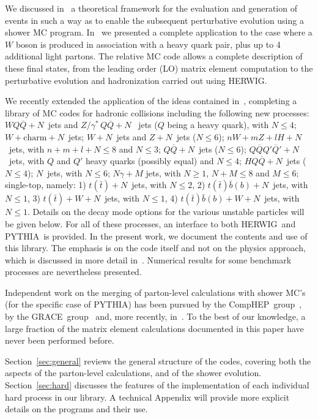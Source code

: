 \documentclass[paper]{JHEP3}
\def    \Qbar   {\overline{Q}}
\def\herwig{{\small HERWIG}}
\def\pythia{{\small PYTHIA}}
\def\grace{{\small GRACE}}
\def\comphep{{\small CompHEP}}
\begin{document}
 We discussed in~\cite{Caravaglios:1999yr} a theoretical framework for
the evaluation and generation of events in such a way as to enable the
subsequent perturbative evolution using a shower MC program.
In~\cite{Mangano:2001xp} we presented a complete application to the
case where a $W$ boson is produced in association with a heavy quark
pair, plus up to 4 additional light partons. The relative MC code
allows a complete description of these final states, from the leading
order (LO) matrix element computation to the perturbative evolution
and hadronization carried out using \herwig.

We recently extended the application of the ideas contained
in~\cite{Caravaglios:1999yr}, completing a library of MC codes for
hadronic collisions including the following new processes: $WQ\Qbar+
N$~jets and $Z/\gamma^{*} \, Q\Qbar+N$ ~jets ($Q$ being a heavy
quark), with $N\le 4$; $W+\mbox{charm}+ N$~jets; 
$W+ N$~jets and $Z+ N$~jets ($N\le 6$);
$nW+mZ+lH+N$~jets, with $n+m+l+N\le 8$ and $N\le3$; $Q\Qbar+N$~jets
($N\le 6$); $Q\Qbar Q'\Qbar'+N$~jets, with $Q$ and $Q'$ heavy quarks
(possibly equal) and $N\le 4$; $H Q \Qbar+N$~jets ($N\le 4$);
$N$~jets, with $N\le 6$; $N\gamma+M$ jets, with $N\ge 1$, $N+M\le 8$ 
and $M\le 6$; single-top, namely: 1) $t(\bar t)+N$~jets, with $N\le 2$, 
2) $t(\bar t) {\bar b}(b)+N$~jets, with $N\le 1$, 3) 
$t(\bar t)+W+N$~jets, with $N\le 1$,  4) $t(\bar t) {\bar b}(b)+W+N$~jets, 
with $N\le 1$. 
Details on the decay mode options for the
various unstable particles will be  given below. For all of these
processes, an interface to both \herwig\ and \pythia\ is provided. In the
present work, we document the contents and use of this library. The
emphasis is on the code itself and not on the physics approach, which
is  discussed in more detail in~\cite{Mangano:2001xp}. Numerical results for
some benchmark processes are nevertheless presented.

Independent work on the merging of parton-level calculations with
shower MC's (for the specific case of \pythia) has been pursued by the
\comphep\ group~\cite{Belyaev:2000wn}, by the \grace\ 
group~\cite{Sato:2001ae} and, more recently, 
in~\cite{Kersevan:2002dd,Tsuno:2002ae,Maltoni:2002qb}. 
To the best of our knowledge, a large fraction of the matrix element
calculations documented in this paper have never been performed before.

Section~\ref{sec:general} reviews the general structure of the codes,
covering both the aspects of the  parton-level calculations, and
of the shower evolution.  Section~\ref{sec:hard} discusses the
features of the implementation of each individual hard process in our
library.  A technical Appendix will provide more explicit details on
the programs and their use.
\end{document}

